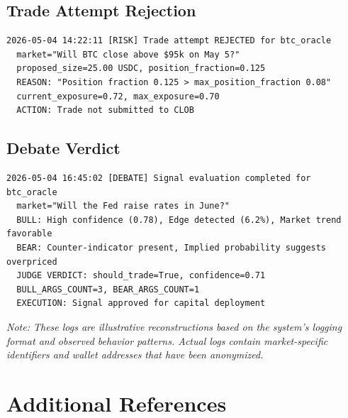 \documentclass[11pt]{article}
\begin{document}
\subsection{Trade Attempt Rejection}

\begin{lstlisting}[language={},caption={Risk manager rejection (RISK log, 2026-05-04)}]
2026-05-04 14:22:11 [RISK] Trade attempt REJECTED for btc_oracle
  market="Will BTC close above $95k on May 5?"
  proposed_size=25.00 USDC, position_fraction=0.125
  REASON: "Position fraction 0.125 > max_position_fraction 0.08"
  current_exposure=0.72, max_exposure=0.70
  ACTION: Trade not submitted to CLOB
\end{lstlisting}

\subsection{Debate Verdict}

\begin{lstlisting}[language={},caption={MiroFish debate verdict (DEBATE log, 2026-05-04)}]
2026-05-04 16:45:02 [DEBATE] Signal evaluation completed for btc_oracle
  market="Will the Fed raise rates in June?"
  BULL: High confidence (0.78), Edge detected (6.2%), Market trend favorable
  BEAR: Counter-indicator present, Implied probability suggests overpriced
  JUDGE VERDICT: should_trade=True, confidence=0.71
  BULL_ARGS_COUNT=3, BEAR_ARGS_COUNT=1
  EXECUTION: Signal approved for capital deployment
\end{lstlisting}

\noindent\textit{Note: These logs are illustrative reconstructions based on the system's logging format and observed behavior patterns. Actual logs contain market-specific identifiers and wallet addresses that have been anonymized.}


\section{Additional References}
\label{sec:refs}
\end{document}

